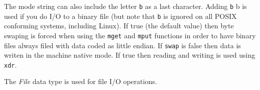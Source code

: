 \begin{parameters}
\begin{varlist}
\begin{description}
    \end{description}
    The mode string can also include the letter \verb+b+ as a last character. 
    Adding \verb+b+ b is used if you do I/O to a binary file 
    (but note that \verb+b+ is ignored on all POSIX conforming systems, including Linux).
     If true (the default value) then byte swaping is forced when using the \verb+mget+ and 
    \verb+mput+ functions in order to have binary files always filed with data coded as little endian. 
    If \verb+swap+ is false then data is writen in the machine native mode. 
     If true then reading and writing is used using \verb+xdr+.
  \end{varlist}
\end{parameters}

\begin{mandescription}
The \emph{File} data type is used for file I/O operations.
\end{mandescription}


